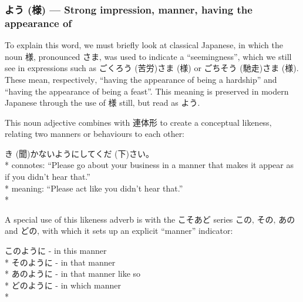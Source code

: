 \documentclass[11pt, b5paper, twoside, openright, onecolumn]{book}
\makeatletter
\newcommand*{\rubystack}[2]{{\relscale{0.5}%
  \begin{tabular}[b]{@{}c@{}}%
    {#1}\\%
   {\textscale{2}{#2}}%
  \end{tabular}}%
}
\DeclareRobustCommand*{\ruby}[2]{%
  \mbox{%
    \setlength{\parskip}{0ex}%
    \BeginAccSupp{method=pdfstringdef,ActualText={#1}}%
      \rubystack{\phantom{#2}}{#1}%
      \llap{%
        \rubystack{#2}{\phantom{#1}}%
      }%
    \EndAccSupp{}%
  }%
}
\renewcommand*{\ruby}[2]{#2 (#1)}%
\newenvironment{exampleblock}{
\setlength{\parindent}{0.6in}
\begin{minipage}[t]{\dimexpr\textwidth-\parindent}}
{\end{minipage}}
\makeatother
\begin{document}
\subsubsection{\ruby{様}{よう} — Strong impression‚ manner‚ having the appearance of}


To explain this word‚ we must briefly look at classical Japanese‚ in which the noun 様‚ pronounced さま‚ was used to indicate a “seemingness”‚ which we still see in expressions such as ご\ruby{苦労}{くろう}\ruby{様}{さま} or ご\ruby{馳走}{ちそう}\ruby{様}{さま}. These mean‚ respectively‚ “having the appearance of being a hardship” and “having the appearance of being a feast”. This meaning is preserved in modern Japanese through the use of 様 still‚ but read as よう.

This noun adjective combines with 連体形 to create a conceptual likeness‚ relating two manners or behaviours to each other:

\vspace{0.4cm}
\begin{exampleblock}
\ruby{聞}{き}かないようにして\ruby{下}{くだ}さい。 \\* 
connotes: “Please go about your business in a manner that makes it appear as if you didn’t hear that.” \\* 
meaning: “Please act like you didn’t hear that.” \\* 
\end{exampleblock}
\vspace{0.2cm}

A special use of this likeness adverb is with the こそあど series この‚ その‚ あの and どの‚ with which it sets up an explicit “manner” indicator:

\vspace{0.4cm}
\begin{exampleblock}
このように - in this manner \\* 
そのように - in that manner \\* 
あのように - in that manner like so \\* 
どのように - in which manner \\* 
\end{exampleblock}
\vspace{0.2cm}
\end{document}
